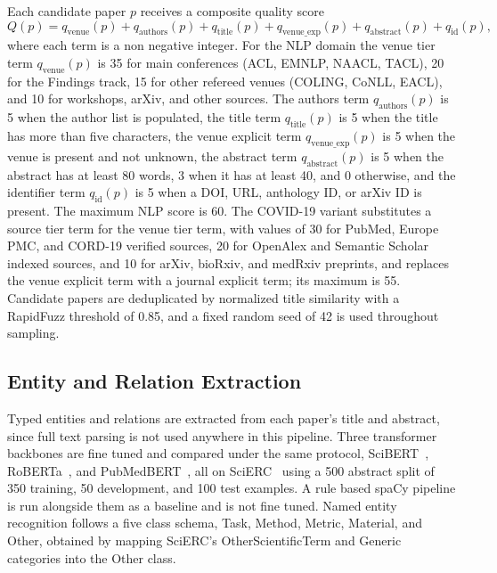 \documentclass{ieeeaccess}
\begin{document}
Each candidate paper $p$ receives a composite quality score
\begin{equation}
Q(p) = q_{\text{venue}}(p) + q_{\text{authors}}(p) + q_{\text{title}}(p) + q_{\text{venue\_exp}}(p) + q_{\text{abstract}}(p) + q_{\text{id}}(p),
\label{eq:quality}
\end{equation}
where each term is a non negative integer. For the NLP domain the venue tier term $q_{\text{venue}}(p)$ is 35 for main conferences (ACL, EMNLP, NAACL, TACL), 20 for the Findings track, 15 for other refereed venues (COLING, CoNLL, EACL), and 10 for workshops, arXiv, and other sources. The authors term $q_{\text{authors}}(p)$ is 5 when the author list is populated, the title term $q_{\text{title}}(p)$ is 5 when the title has more than five characters, the venue explicit term $q_{\text{venue\_exp}}(p)$ is 5 when the venue is present and not unknown, the abstract term $q_{\text{abstract}}(p)$ is 5 when the abstract has at least 80 words, 3 when it has at least 40, and 0 otherwise, and the identifier term $q_{\text{id}}(p)$ is 5 when a DOI, URL, anthology ID, or arXiv ID is present. The maximum NLP score is 60. The COVID-19 variant substitutes a source tier term for the venue tier term, with values of 30 for PubMed, Europe PMC, and CORD-19 verified sources, 20 for OpenAlex and Semantic Scholar indexed sources, and 10 for arXiv, bioRxiv, and medRxiv preprints, and replaces the venue explicit term with a journal explicit term; its maximum is 55. Candidate papers are deduplicated by normalized title similarity with a RapidFuzz threshold of 0.85, and a fixed random seed of 42 is used throughout sampling.

\subsection{Entity and Relation Extraction}
\label{sec:extraction}

Typed entities and relations are extracted from each paper's title and abstract, since full text parsing is not used anywhere in this pipeline. Three transformer backbones are fine tuned and compared under the same protocol, SciBERT~\cite{beltagy2019scibert}, RoBERTa~\cite{liu2019roberta}, and PubMedBERT~\cite{gu2021domain}, all on SciERC~\cite{luan2018multi} using a 500 abstract split of 350 training, 50 development, and 100 test examples. A rule based spaCy pipeline is run alongside them as a baseline and is not fine tuned. Named entity recognition follows a five class schema, Task, Method, Metric, Material, and Other, obtained by mapping SciERC's OtherScientificTerm and Generic categories into the Other class.
\end{document}
